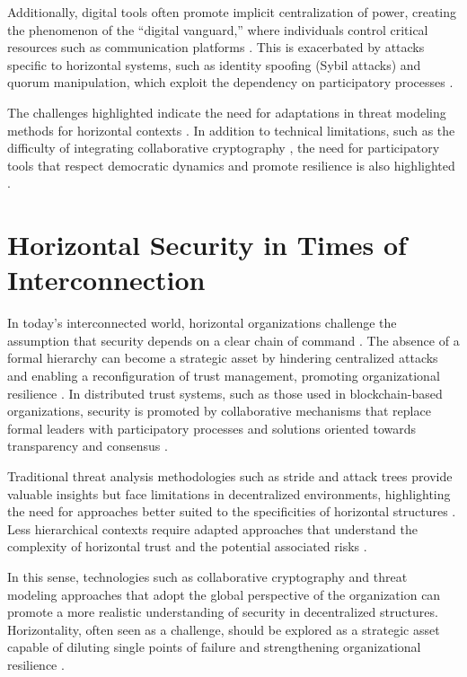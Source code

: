 Additionally, digital tools often promote implicit centralization of power,
creating the phenomenon of the “digital vanguard,” where individuals control
critical resources such as communication platforms \cite{SocialMediaTeamsAsDigitalVanguards}.
This is exacerbated by attacks specific to horizontal systems, such as identity spoofing (Sybil
attacks) and quorum manipulation, which exploit the dependency on participatory
processes \cite{MitigationSybilAttack, TheSybilAttack}.

The challenges highlighted indicate the need for adaptations in threat modeling
methods for horizontal contexts \cite{Colbac}. In addition to technical
limitations, such as the difficulty of integrating collaborative cryptography
\cite{AbcCrypto}, the need for participatory tools that respect democratic
dynamics and promote resilience is also highlighted \cite{SecurityCardsToolkit}.

\section{Horizontal Security in Times of Interconnection}
\label{sec:horizontal_security_interconnection}

In today’s interconnected world, horizontal organizations challenge the
assumption that security depends on a clear chain of command
\cite{Non-HierarchicalForms, EverydayRevolutions}.
The absence of a formal hierarchy can become a strategic asset by hindering
centralized attacks and enabling a reconfiguration of trust management,
promoting organizational resilience \cite{EverydayRevolutions, Colbac}. In
distributed trust systems, such as those used in blockchain-based organizations,
security is promoted by collaborative mechanisms that replace formal leaders
with participatory processes and solutions oriented towards transparency and
consensus \cite{Reputation-basedDAO, AbcCrypto}.

Traditional threat analysis methodologies such as \gls{stride} and attack trees
provide valuable insights but face limitations in decentralized environments,
highlighting the need for approaches better suited to the specificities of
horizontal structures \cite{ThreatModellingSurvey,
ThreatModelingASummaryOfAvailableMethods}. Less hierarchical contexts require
adapted approaches that understand the complexity of horizontal trust and the
potential associated risks \cite{Colbac}.

In this sense, technologies such as collaborative cryptography \cite{Colbac,
AbcCrypto} and threat modeling approaches that adopt the global perspective of
the organization can promote a more realistic understanding of security in
decentralized structures. Horizontality, often seen as a challenge, should be
explored as a strategic asset capable of diluting single points of failure and
strengthening organizational resilience \cite{EverydayRevolutions}.


